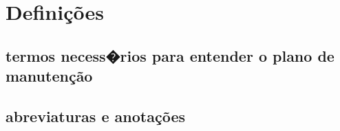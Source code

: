\chapter{Definições}

\section{termos necess�rios para entender o plano de manutenção}

\section{abreviaturas e anotações}